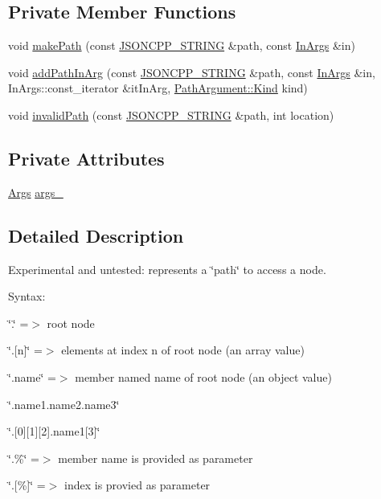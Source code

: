 \subsection*{Private Member Functions}
\begin{DoxyCompactItemize}
\item 
void \hyperlink{class_json_1_1_path_a362a420a47acb1a1f9c79173cbfef94d}{make\+Path} (const \hyperlink{json_8h_a1e723f95759de062585bc4a8fd3fa4be}{J\+S\+O\+N\+C\+P\+P\+\_\+\+S\+T\+R\+I\+NG} \&path, const \hyperlink{class_json_1_1_path_ab29d7b2fc896c7d3c5ed4609af3a3f23}{In\+Args} \&in)
\item 
void \hyperlink{class_json_1_1_path_ae65717a5fbc35b1336cbf783b15aad2e}{add\+Path\+In\+Arg} (const \hyperlink{json_8h_a1e723f95759de062585bc4a8fd3fa4be}{J\+S\+O\+N\+C\+P\+P\+\_\+\+S\+T\+R\+I\+NG} \&path, const \hyperlink{class_json_1_1_path_ab29d7b2fc896c7d3c5ed4609af3a3f23}{In\+Args} \&in, In\+Args\+::const\+\_\+iterator \&it\+In\+Arg, \hyperlink{class_json_1_1_path_argument_a2420bbad778573c147e578701b84d9b9}{Path\+Argument\+::\+Kind} kind)
\item 
void \hyperlink{class_json_1_1_path_a0fa77fc0cefefcfcf2f1242c79009dd9}{invalid\+Path} (const \hyperlink{json_8h_a1e723f95759de062585bc4a8fd3fa4be}{J\+S\+O\+N\+C\+P\+P\+\_\+\+S\+T\+R\+I\+NG} \&path, int location)
\end{DoxyCompactItemize}
\subsection*{Private Attributes}
\begin{DoxyCompactItemize}
\item 
\hyperlink{class_json_1_1_path_a27d96232d034d7a78286468676f9cb3e}{Args} \hyperlink{class_json_1_1_path_af33d0de7ee9f99d3e361bdf504dc2bc7}{args\+\_\+}
\end{DoxyCompactItemize}


\subsection{Detailed Description}
Experimental and untested\+: represents a \char`\"{}path\char`\"{} to access a node. 

Syntax\+:
\begin{DoxyItemize}
\item \char`\"{}.\char`\"{} =$>$ root node
\item \char`\"{}.\mbox{[}n\mbox{]}\char`\"{} =$>$ elements at index \textquotesingle{}n\textquotesingle{} of root node (an array value)
\item \char`\"{}.\+name\char`\"{} =$>$ member named \textquotesingle{}name\textquotesingle{} of root node (an object value)
\item \char`\"{}.\+name1.\+name2.\+name3\char`\"{}
\item \char`\"{}.\mbox{[}0\mbox{]}\mbox{[}1\mbox{]}\mbox{[}2\mbox{]}.\+name1\mbox{[}3\mbox{]}\char`\"{}
\item \char`\"{}.\%\char`\"{} =$>$ member name is provided as parameter
\item \char`\"{}.\mbox{[}\%\mbox{]}\char`\"{} =$>$ index is provied as parameter 
\end{DoxyItemize}

